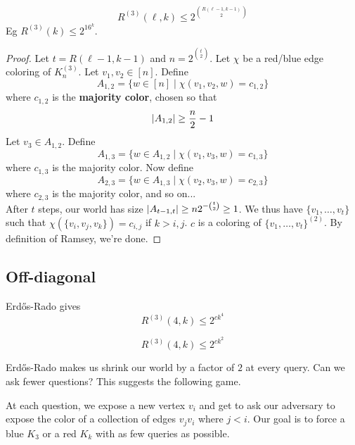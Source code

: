 \documentclass{article}
\begin{document}
\begin{thm}
  $$R^{(3)}(\ell, k) \le 2^{\binom{R(\ell - 1, k - 1)}2}$$
  Eg $R^{(3)}(k) \le 2^{16^k}$.
\end{thm}
\begin{proof}
  Let $t = R(\ell - 1, k - 1)$ and $n = 2^{\binom t2}$. Let $\chi$ be a red/blue edge coloring of $K_n^{(3)}$. Let $v_1, v_2 \in [n]$. Define
  $$A_{1, 2} = \{w \in [n] \mid \chi({v_1, v_2, w}) = c_{1, 2}\}$$
  where $c_{1, 2}$ is the {\bf majority color}, chosen so that
  $$\left\lvert A_{1, 2}\right\rvert \ge \frac n2 - 1$$
  Let $v_3 \in A_{1, 2}$. Define
  $$A_{1, 3} = \{w \in A_{1, 2} \mid \chi({v_1, v_3, w}) = c_{1, 3}\}$$
  where $c_{1, 3}$ is the majority color. Now define
  $$A_{2, 3} = \{w \in A_{1, 3} \mid \chi({v_2, v_3, w}) = c_{2, 3}\}$$
  where $c_{2, 3}$ is the majority color, and so on... \\
  After $t$ steps, our world has size $\left\lvert A_{t - 1, t}\right\rvert \ge n2^{-\binom t2} \ge 1$. We thus have $\{v_1, \dots, v_t\}$ such that $\chi(\{v_i, v_j, v_k\}) = c_{i, j}$ if $k > i, j$. $c$ is a coloring of $\{v_1, \dots, v_t\}^{(2)}$. By definition of Ramsey, we're done.
\end{proof}

\clearpage

\subsection{Off-diagonal}

\newlec

Erd\H os-Rado gives
$$R^{(3)}(4, k) \le 2^{ck^4}$$

\begin{thm}
  $$R^{(3)}(4, k) \le 2^{ck^2}$$
\end{thm}

Erd\H os-Rado makes us shrink our world by a factor of $2$ at every query. Can we ask fewer questions? This suggests the following game.

\begin{dfn}
  At each question, we expose a new vertex $v_i$ and get to ask our adversary to expose the color of a collection of edges $v_j v_i$ where $j < i$. Our goal is to force a blue $K_3$ or a red $K_k$ with as few queries as possible.
\end{dfn}
\end{document}
